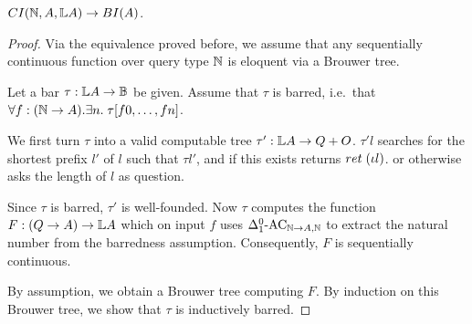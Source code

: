 \documentclass[a4paper,UKenglish,cleveref, autoref, thm-restate]{lipics-v2021}
\begin{document}
\begin{lemma}
  $\CI(\nat,A,\List A) \to \BI(A)$.
\end{lemma}
\begin{proof}
  Via the equivalence proved before, we assume that any sequentially continuous function over query type $\mathbb{N}$
  is eloquent via a Brouwer tree.

  Let a bar $\tau : \mathbb{L} A \to \mathbb{B}$ be given.
  Assume that $\tau$ is barred, i.e.\ that
  $\forall f : (\mathbb{N} \to A).\exists n.\;\tau [f0,\dots,fn]$.

  We first turn $\tau$ into a valid computable tree $\tau' : \mathbb{L} A \to Q + O$.
  $\tau' l$ searches for the shortest prefix $l'$ of $l$ such that $\tau l'$,
  and if this exists returns $\return (\iota l)$.
  or otherwise asks the length of $l$ as question.

  Since $\tau$ is barred, $\tau'$ is well-founded.
  Now $\tau$ computes the function $F : (Q \to A) \to \mathbb{L} A$
  which on input $f$ uses $\Delta^0_1\text{-AC}_{\mathbb{N} \to A, \mathbb{N}}$ to extract the natural number from the barredness assumption.  
  Consequently, $F$ is sequentially continuous.

  By assumption, we obtain a Brouwer tree computing $F$.
  By induction on this Brouwer tree, we show that $\tau$ is inductively barred.
\end{proof}


\end{document}
